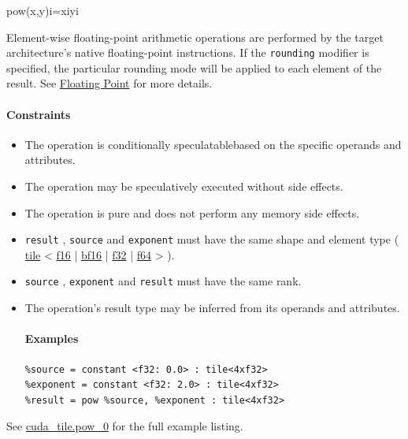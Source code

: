 \documentclass{article}
\begin{document}
pow(x,y)i=xiyi

Element-wise floating-point arithmetic operations are performed by the target architecture's native floating-point instructions. If the \texttt{rounding} modifier is specified, the particular rounding mode will be applied to each element of the result. See \href{https://docs.nvidia.com/cuda/tile-ir/latest/sections/operations.html#op-group-floating-point}{Floating Point} for more details.



\paragraph{Constraints}

\begin{itemize}
\item The operation is conditionally speculatablebased on the specific operands and attributes.
\item The operation may be speculatively executed without side effects.
\item The operation is pure and does not perform any memory side effects.
\item \texttt{result} , \texttt{source} and \texttt{exponent} must have the same shape and element type ( \href{https://docs.nvidia.com/cuda/tile-ir/latest/sections/types.html#type-tile}{tile} < \href{https://docs.nvidia.com/cuda/tile-ir/latest/sections/types.html#subsection-element-types}{f16} | \href{https://docs.nvidia.com/cuda/tile-ir/latest/sections/types.html#subsection-element-types}{bf16} | \href{https://docs.nvidia.com/cuda/tile-ir/latest/sections/types.html#subsection-element-types}{f32} | \href{https://docs.nvidia.com/cuda/tile-ir/latest/sections/types.html#subsection-element-types}{f64} > ).
\item \texttt{source} , \texttt{exponent} and \texttt{result} must have the same rank.
\item The operation's result type may be inferred from its operands and attributes.


\paragraph{Examples}

\begin{lstlisting}
%source = constant <f32: 0.0> : tile<4xf32>
%exponent = constant <f32: 2.0> : tile<4xf32>
%result = pow %source, %exponent : tile<4xf32>
\end{lstlisting}

\end{itemize}
See \href{https://docs.nvidia.com/cuda/tile-ir/latest/sections/appendix.html#example-cuda-tile-pow-0}{cuda\_tile.pow\_0} for the full example listing.
\end{document}
